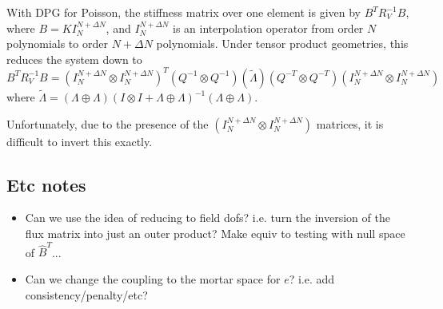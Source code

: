 \documentclass{article}
\begin{document}
With DPG for Poisson, the stiffness matrix over one element is given by $B^TR_V^{-1}B$, where $B = KI_N^{N+\Delta N}$, and $I_N^{N+\Delta N}$ is an interpolation operator from order $N$ polynomials to order ${N+\Delta N}$ polynomials.  Under tensor product geometries, this reduces the system down to 
\[
B^TR_V^{-1}B = (I_N^{N+\Delta N}\otimes I_N^{N+\Delta N})^T (Q^{-1}\otimes Q^{-1}) (\tilde{\Lambda}) (Q^{-T}\otimes Q^{-T})(I_N^{N+\Delta N}\otimes I_N^{N+\Delta N})
\]
where $\tilde{\Lambda} = (\Lambda\oplus \Lambda) (I \otimes I + \Lambda \oplus \Lambda)^{-1}(\Lambda\oplus \Lambda)$.  

Unfortunately, due to the presence of the $(I_N^{N+\Delta N}\otimes I_N^{N+\Delta N})$ matrices, it is difficult to invert this exactly.  

\subsection{Etc notes}
\begin{itemize}
\item Can we use the idea of reducing to field dofs?  i.e. turn the inversion of the flux matrix into just an outer product?  Make equiv to testing with null space of $\hat{B}^T$...
\item Can we change the coupling to the mortar space for $e$?  i.e. add consistency/penalty/etc?
\end{itemize}
\end{document}
